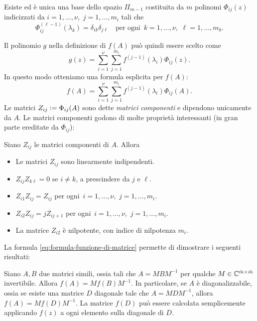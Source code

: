 \begin{teor}
Esiste ed è unica una base dello spazio $\Pi_{m-1}$ costituita da $m$ polinomi
$\Phi_{ij}(z)$ indicizzati da $i = 1,\dots,\nu$, $\,j = 1,\dots,m_i$ tali che
\[
\Phi_{ij}^{(\ell-1)}(\lambda_k) = \delta_{ik} \delta_{j\ell}
\quad \text{per ogni $\,k = 1,\dots,\nu$, $\,\ell = 1,\dots,m_k$.}
\]
\end{teor}

\noindent Il polinomio $g$ nella definizione di $f(A)$ può quindi essere scelto come
\[
g(z) = \sum_{i=1}^\nu \sum_{j=1}^{m_i} f^{(j-1)}(\lambda_i) \Phi_{ij}(z).
\]
In questo modo otteniamo una formula esplicita per $f(A)$:
\begin{equation} \label{eq:formula-funzione-di-matrice}
f(A) = \sum_{i=1}^\nu \sum_{j=1}^{m_i} f^{(j-1)}(\lambda_i) \Phi_{ij}(A).
\end{equation}
Le matrici $Z_{ij} \vcentcolon= \Phi_{ij}(A)$ sono dette \emph{matrici componenti} e
dipendono unicamente da $A$. Le matrici componenti godono di molte proprietà
interessanti (in gran parte ereditate da $\Phi_{ij}$):

\begin{teor}
Siano $Z_{ij}$ le matrici componenti di $A$. Allora
\begin{itemize}
\item Le matrici $Z_{ij}$ sono linearmente indipendenti.
\item $Z_{ij}Z_{k\ell}=0$ se $i \neq k$, a prescindere da $j$ e $\ell$.
\item $Z_{i1}Z_{ij} = Z_{ij}$ per ogni $\,i = 1,\dots,\nu$, $\,j = 1,\dots,m_i$.
\item $Z_{i2}Z_{ij} = jZ_{ij+1}$ per ogni $\,i = 1,\dots,\nu$, $\,j = 1,\dots,m_i$.
\item La matrice $Z_{i2}$ è nilpotente, con indice di nilpotenza $m_i$.
\end{itemize}
\end{teor}

\noindent La formula \eqref{eq:formula-funzione-di-matrice}
permette di dimostrare i seguenti risultati:

\begin{teor} \label{teor:funzione-di-matrice-diagonalizzabile}
Siano $A,B$ due matrici simili, ossia tali che $A = MBM^{-1}$ per qualche
$M \in \mathbb{C}^{\bar{m}\times\bar{m}}$ invertibile. Allora $f(A) = Mf(B)M^{-1}$.
In particolare, se $A$ è diagonalizzabile, ossia se esiste una matrice $D$ diagonale
tale che $A = MDM^{-1}$, allora $f(A) = Mf(D)M^{-1}$.
La matrice $f(D)$ può essere calcolata semplicemente applicando $f(z)$
a ogni elemento sulla diagonale di $D$.
\end{teor}

